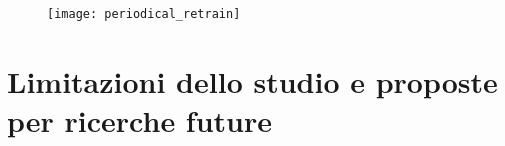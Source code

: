 \begin{figure}[!ht]
    \centering
    \texttt{[image: periodical\_retrain]}
    \caption{}
    \label{}
\end{figure}

\section{Limitazioni dello studio e proposte per ricerche future}










%

